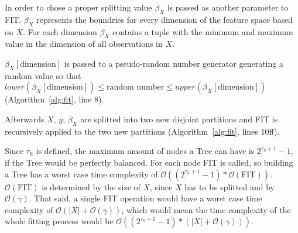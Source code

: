 In order to chose a proper splitting value $\beta_X$ is
passed as another parameter to FIT. $\beta_X$ represents
the boundries for every dimension of the feature space
based on $X$. For each dimension $\beta_X$ contains a
tuple with the minimum and maximum value in the dimension
of all observations in $X$.

$\beta_X[\text{dimension}]$ is passed to a pseudo-random
number generator generating a random value so that
$lower(\beta_X[\text{dimension}]) \leq \text{random number}
\leq upper(\beta_X[\text{dimension}])$
(Algorithm~\ref{alg:fit}, line 8).

Afterwards $X$, $y$, $\beta_X$ are splitted into two new
disjoint partitions and FIT is recursively applied to the
two new partitions (Algorithm~\ref{alg:fit}, lines 10ff).

Since $\tau_h$ is defined, the maximum amount of nodes a
Tree can have is $2^{\tau_h + 1} - 1$\cite[chapter 16.1]%
{Teschl}, if the Tree would be perfectly balanced. For each
node FIT is called, so building a Tree has a worst case
time complexity of $\mathcal{O}((2^{\tau_h + 1} -1)*
\mathcal{O}(\text{FIT}))$. $\mathcal{O}(\text{FIT})$ is
determined by the size of $X$, since $X$ has to be splitted
and by $\mathcal{O}(\gamma)$. That said, a single FIT
operation would have a worst case time complexity of
$\mathcal{O}(|X| + \mathcal{O}(\gamma))$, which would mean
the time complexity of the whole fitting process would be
$\mathcal{O}((2^{\tau_h + 1} - 1) * (|X| + \mathcal{O}
(\gamma)))$.


